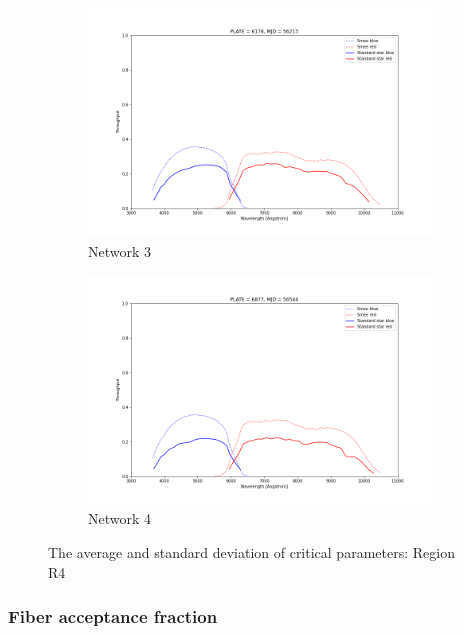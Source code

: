 \begin{figure}
\begin{subfigure}[b]{0.475\textwidth}
            \includegraphics[width=\textwidth]{images/specsim/throughput_6178_56213.png}
            \caption[]%
            {{\small Network 3}}    
            \label{fig:thru3}
        \end{subfigure}
        \hfill
        \begin{subfigure}[b]{0.475\textwidth}   
            \centering 
            \includegraphics[width=\textwidth]{images/specsim/throughput_6877_56544.png}
            \caption[]%
            {{\small Network 4}}    
            \label{fig:thru4}
        \end{subfigure}
        \caption[ The average and standard deviation of critical parameters ]
        {\small The average and standard deviation of critical parameters: Region R4} 
        \label{fig:throughput_comparison}
    \end{figure}

\subsubsection{Fiber acceptance fraction}
\label{sec:fiberloss}

